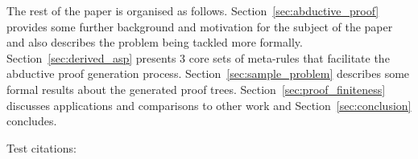The rest of the paper is organised as
follows. Section~\ref{sec:abductive_proof} provides some further background
and motivation for the subject of the paper and also describes the problem
being tackled more formally. Section~\ref{sec:derived_asp} presents 3 core
sets of meta-rules that facilitate the abductive proof generation
process. Section~\ref{sec:sample_problem} describes some formal results about
the generated proof trees. Section~\ref{sec:proof_finiteness} discusses
applications and comparisons to other work and Section~\ref{sec:conclusion}
concludes.

Test citations: \cite{lim22:_autom_defeas_reason_law,mahajan22:_overv_cclaw_l4}


